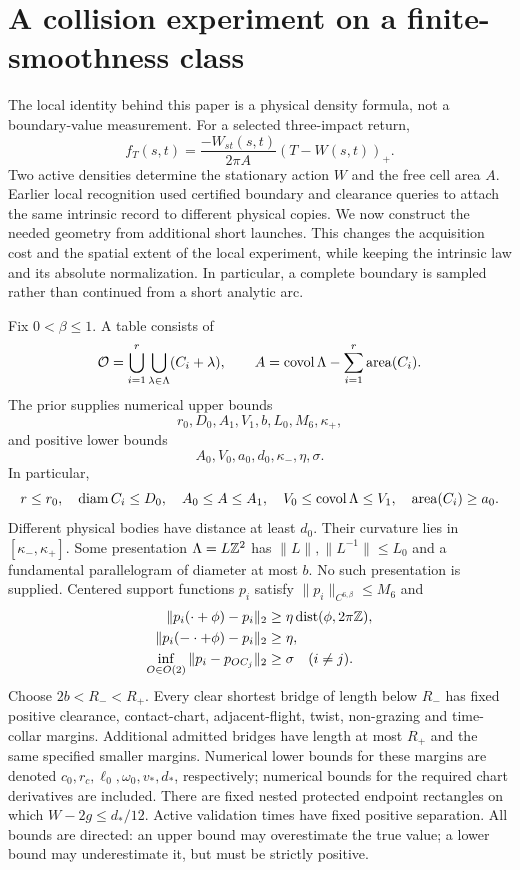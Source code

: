 \section{A collision experiment on a finite-smoothness class}
\label{sec:setting}
The local identity behind this paper is a physical density formula, not
a boundary-value measurement. For a selected three-impact return,
\[
 f_T(s,t)=\frac{-W_{st}(s,t)}{2\pi A}(T-W(s,t))_+.
\]
Two active densities determine the stationary action $W$ and the free
cell area $A$. Earlier local recognition used certified boundary and
clearance queries to attach the same intrinsic record to different
physical copies. We now construct the needed geometry from additional
short launches. This changes the acquisition cost and the spatial extent
of the local experiment, while keeping the intrinsic law and its absolute
normalization. In particular, a complete boundary is sampled rather than
continued from a short analytic arc.

\begin{definition}\label{def:prior}
Fix $0<\beta\le1$. A table consists of
\[
 \mathcal O=\bigcup_{i=1}^r\bigcup_{\lambda\in\Lambda}(C_i+\lambda),
 \qquad A=\operatorname{covol}\Lambda-\sum_{i=1}^r\operatorname{area}(C_i).
\]
The prior supplies numerical upper bounds
\[
 r_0,D_0,A_1,V_1,b,L_0,M_6,\kappa_+,
\]
and positive lower bounds
\[
 A_0,V_0,a_0,d_0,\kappa_-,\eta,\sigma.
\]
In particular,
\[
 r\le r_0,\quad \operatorname{diam}C_i\le D_0,\quad
 A_0\le A\le A_1,\quad V_0\le\operatorname{covol}\Lambda\le V_1,\quad
 \operatorname{area}(C_i)\ge a_0.
\]
Different physical bodies have distance at least $d_0$. Their curvature
lies in $[\kappa_-,\kappa_+]$. Some presentation $\Lambda=L\mathbb Z^2$ has
$\|L\|,\|L^{-1}\|\le L_0$ and a fundamental parallelogram of diameter
at most $b$. No such presentation is supplied. Centered support functions
$p_i$ satisfy $\|p_i\|_{C^{6,\beta}}\le M_6$ and
\begin{align}
 \|p_i(\cdot+\phi)-p_i\|_2&\ge\eta\operatorname{dist}(\phi,2\pi\mathbb Z),\label{eq:rot}\\
 \|p_i(-\cdot+\phi)-p_i\|_2&\ge\eta,\label{eq:reflection}\\
 \inf_{O\in O(2)}\|p_i-p_{OC_j}\|_2&\ge\sigma\quad(i\ne j).\label{eq:types}
\end{align}
Choose $2b<R_-<R_+$. Every clear shortest bridge of length below $R_-$
has fixed positive clearance, contact-chart, adjacent-flight, twist,
non-grazing and time-collar margins. Additional admitted bridges have
length at most $R_+$ and the same specified smaller margins. Numerical
lower bounds for these margins are denoted $c_0,r_c,\ell_0,\omega_0,v_*,d_*$,
respectively; numerical bounds for the required chart derivatives are
included. There are fixed nested protected endpoint rectangles on which
$W-2g\le d_*/12$. Active validation times have fixed positive separation.
All bounds are directed: an upper bound may overestimate the true value;
a lower bound may underestimate it, but must be strictly positive.
\end{definition}

